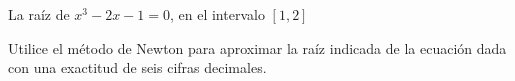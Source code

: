 \setcounter{enumi}{6}
\item La raíz de $x^3 - 2x - 1 = 0$, en el intervalo $[1, 2]$
\par
Utilice el método de Newton para aproximar la raíz indicada de la ecuación dada con una exactitud de seis cifras decimales.
